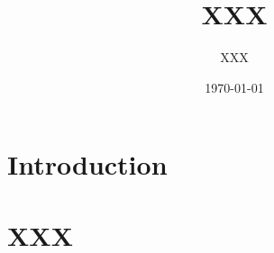 \documentclass[12pt]{beamer}
\title{XXX}
\author{XXX}
\institute{XXX University}
\date{\today}
\begin{document}
{
\begin{frame}
	\titlepage
\end{frame}
}

\section{Introduction}
\begin{frame}
	
\end{frame}
\section{XXX}
\end{document}
